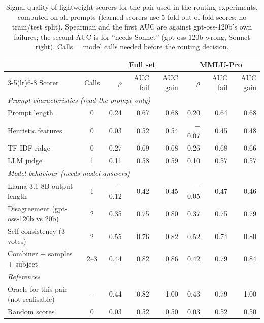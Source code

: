 \begin{table}[!htbp]
\centering\small
\caption{Signal quality of lightweight scorers for the pair used in the routing experiments, computed on all prompts (learned scorers use 5-fold out-of-fold scores; no train/test split). Spearman and the first AUC are against gpt-oss-120b's own failures; the second AUC is for ``needs Sonnet'' (gpt-oss-120b wrong, Sonnet right). Calls = model calls needed before the routing decision.}\label{tab:signal}
\begin{tabular}{lcrrrrrr}
\toprule
 & & \multicolumn{3}{c}{Full set} & \multicolumn{3}{c}{MMLU-Pro} \\
\cmidrule(lr){3-5}\cmidrule(lr){6-8}
Scorer & Calls & $\rho$ & AUC fail & AUC gain & $\rho$ & AUC fail & AUC gain \\
\midrule
\multicolumn{8}{l}{\emph{Prompt characteristics (read the prompt only)}} \\
Prompt length & 0 & 0.24 & 0.67 & 0.68 & 0.20 & 0.64 & 0.68 \\
Heuristic features & 0 & 0.03 & 0.52 & 0.54 & $-$0.07 & 0.45 & 0.48 \\
TF-IDF ridge & 0 & 0.27 & 0.69 & 0.68 & 0.26 & 0.68 & 0.66 \\
LLM judge & 1 & 0.11 & 0.58 & 0.59 & 0.10 & 0.57 & 0.57 \\
\midrule
\multicolumn{8}{l}{\emph{Model behaviour (needs model answers)}} \\
Llama-3.1-8B output length & 1 & $-$0.12 & 0.42 & 0.45 & $-$0.05 & 0.47 & 0.46 \\
Disagreement (gpt-oss-120b vs 20b) & 2 & 0.35 & 0.75 & 0.80 & 0.37 & 0.75 & 0.79 \\
Self-consistency (3 votes) & 2 & 0.55 & 0.76 & 0.82 & 0.52 & 0.74 & 0.80 \\
Combiner + samples + subject & 2--3 & 0.44 & 0.82 & 0.86 & 0.42 & 0.79 & 0.84 \\
\midrule
\multicolumn{8}{l}{\emph{References}} \\
Oracle for this pair (not realisable) & -- & 0.44 & 0.82 & 1.00 & 0.43 & 0.79 & 1.00 \\
Random scores & 0 & 0.03 & 0.52 & 0.50 & 0.03 & 0.52 & 0.50 \\
\bottomrule
\end{tabular}
\end{table}

